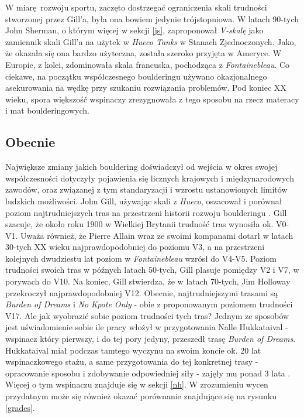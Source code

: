 \documentclass{article}
\begin{document}
W miarę rozwoju sportu, zaczęto dostrzegać ograniczenia skali trudności stworzonej przez Gill'a, była ona bowiem jedynie trójstopniowa. W latach 90-tych John Sherman, o którym więcej w sekcji \ref{js}, zaproponował \textit{V-skalę} jako zamiennik skali Gill'a na użytek w \textit{Hueco Tanks} w Stanach Zjednoczonych. Jako, że okazała się ona bardzo użyteczna, została szeroko przyjęta w Ameryce. W Europie, z kolei, zdominowała skala francuska, pochodząca z \textit{Fontainebleau}. Co ciekawe, na początku współczesnego boulderingu używano okazjonalnego asekurowania na wędkę przy szukaniu rozwiązania problemów. Pod koniec XX wieku, spora większość wspinaczy zrezygnowała z tego sposobu na rzecz materacy i mat boulderingowych.

\subsection{Obecnie}
Największe zmiany jakich bouldering doświadczył od wejścia w okres swojej współczesności dotyczyły pojawienia się licznych krajowych i międzynarodowych zawodów, oraz związanej z tym standaryzacji i wzrostu ustanowionych limitów ludzkich możliwości. John Gill, używając skali z \textit{Hueco}, oszacował i porównał poziom najtrudniejszych tras na przestrzeni historii rozwoju boulderingu \cite{gill-history}. Gill szacuje, że około roku 1900 w Wielkiej Brytanii trudność tras wynosiła ok. V0-V1. Uważa również, że Pierre Allain wraz ze swoimi kompanami dotarł w latach 30-tych XX wieku najprawdopodobniej do poziomu V3, a na przestrzeni kolejnych dwudziestu lat poziom w \textit{Fontainebleau} wzrósł do V4-V5. Poziom trudności swoich tras w późnych latach 50-tych, Gill plasuje pomiędzy V2 i V7, w porywach do V10. Na koniec, Gill stwierdza, że w latach 70-tych, Jim Holloway przekroczył najprawdopodobniej V12. Obecnie, najtrudniejszymi trasami są \textit{Burden of Dreams} i \textit{No Kpote Only} - obie z proponowanym poziomem trudności V17. Ale jak wyobrazić sobie poziom trudności tych tras? Jednym ze sposobów jest uświadomienie sobie ile pracy włożył w przygotowania Nalle Hukkataival - wspinacz który pierwszy, i do tej pory jedyny, przeszedł trasę \textit{Burden of Dreams}. Hukkataival miał podczas tamtego wyczynu na swoim koncie ok. 20 lat wspinaczkowego stażu, a same przygotowania do tej konkretnej trasy - opracowanie sposobu i zdobywanie odpowiedniej siły - zajęły mu ponad 3 lata \cite{hukkataival-yt}. Więcej o tym wspinaczu znajduje się w sekcji \ref{nh}. W zrozumieniu wycen przydatnym może się również okazać porównanie znajdujące się na rysunku \ref{grades}.  
\end{document}
